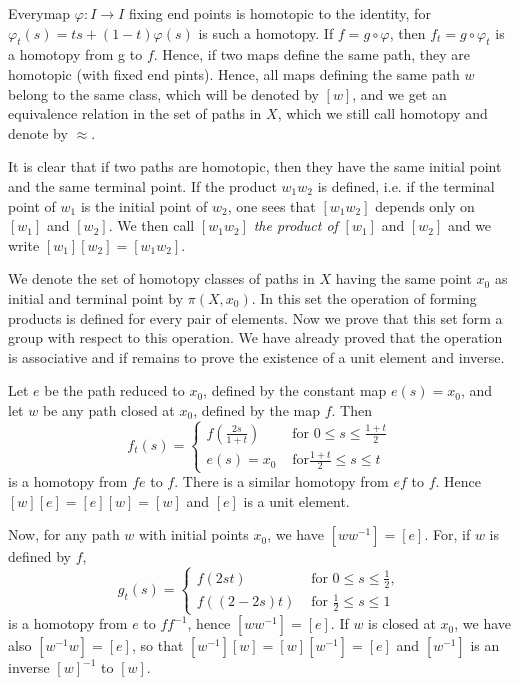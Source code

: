 Every\pageoriginale map $\varphi:I \to I$ fixing end points is
homotopic to the 
identity, for $\varphi_t(s)=ts+(1-t)\varphi (s)$ is such a
homotopy. If $f=g\circ\varphi$, then $f_t=g\circ\varphi_t$ is a homotopy
from g to $f$. Hence, if two maps define the same path, they are
homotopic (with fixed end pints). Hence, all maps defining the same
path $w$ belong to the same class, which will be denoted by $[w]$,
and we get an equivalence relation in the set of paths in $X$, which
we still call homotopy and denote by $\approx$. 

It is clear that if two paths are homotopic, then they have the same
initial point and the same terminal point. If the product $w_1 w_2$ is
defined, i.e. if the terminal point of $w_1$ is the initial point of
$w_2$, one sees that $[w_1 w_2]$ depends only on $[w_1]$ and
$[w_2]$. We then call $[w_1 w_2]$ \textit{the product of} $[w_1]$ and
$[w_2]$ and we write $[w_1][w_2]=[w_1w_2]$. 

We denote the set of homotopy classes of paths in $X$ having the same
point $x_0$ as initial and terminal point by $\pi (X,x_0)$. In this
set the operation of forming products is defined for every pair of
elements. Now we prove that this set form a group with respect to this
operation. We have already proved that the operation is associative
and if remains to prove the existence of a unit element and inverse. 

Let $e$ be the path reduced to $x_0$, defined by the constant map
$e(s)=x_0$, and let $w$ be any path closed at $x_0$, defined by the
map $f$. Then 
$$
f_t(s)=
\begin{cases}
f (\frac{2s}{1+t}) & \text{ for } 0 \leq s \leq \frac{1+t}{2}\\
e(s)=x_0 &\text{ for} \frac{1+t}{2} \leq s \leq t
\end{cases}
$$\pageoriginale
is a homotopy from $fe$ to $f$. There is a similar homotopy from $ef$ to
$f$. Hence $[w][e]=[e][w]=[w]$ and $[e]$ is a unit element. 

Now, for any path $w$ with initial points $x_0$, we have
$[ww^{-1}]=[e]$. For, if $w$ is defined by $f$, 
$$
g_t(s)=
\begin{cases}
f(2st) & \text{ for } 0 \leq s \leq \frac{1}{2},\\
f((2-2s)t) & \text{ for } \frac{1}{2} \leq s \leq 1
\end{cases}
$$
is a homotopy from $e$ to $ff^{-1}$, hence $[ww^{-1}]=[e]$. If $w$ is
closed at $x_0$, we have also $[w^{-1}w]=[e]$, so that
$[w^{-1}][w]=[w][w^{-1}]=[e]$ and $[w^{-1}]$ is an inverse $[w]^{-1}$
to $[w]$.  

